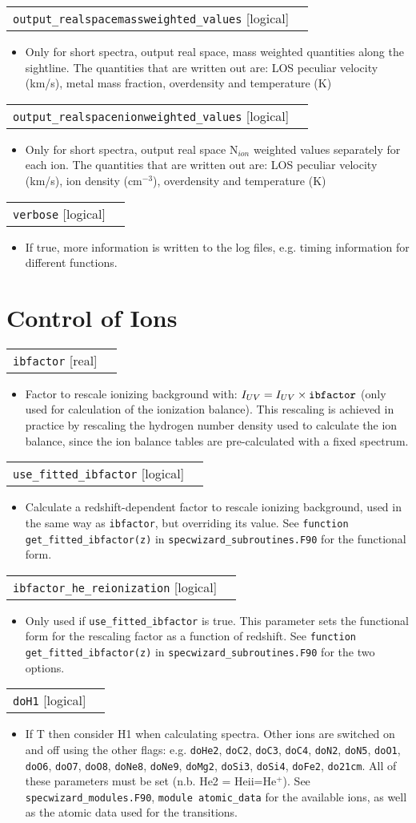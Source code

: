 \documentclass{report}
\makeatletter
\newcommand{\paramdefinition}[3]{
\begin{tabular*}{\textwidth}{l@{\extracolsep{\fill}}r}
		{\tt #1} [{\sc #2}]& #3 \\
\end{tabular*}}
\newcommand{\paramdescription}[1]{
\begin{itemize}
\item #1
\end{itemize}\vspace{0.2cm}}
\newcommand{\param}[1]{{\tt #1}}
\makeatother
\begin{document}
\paramdefinition{output\_realspacemassweighted\_values}{logical}{ }
\paramdescription{Only for short spectra, output real space, mass weighted quantities along the sightline.  The quantities that are written out are: LOS peculiar velocity (km/s), metal mass fraction, overdensity and temperature (K)}

\paramdefinition{output\_realspacenionweighted\_values}{logical}{ }
\paramdescription{Only for short spectra, output real space N$_{ion}$ weighted values separately for each ion.  The quantities that are written out are: LOS peculiar velocity (km/s), ion density (cm$^{-3}$), overdensity and temperature (K)}

\paramdefinition{verbose}{logical}{ }
\paramdescription{If true, more information is written to the log files, e.g. timing information for different functions.}


\section{Control of Ions}

\paramdefinition{ibfactor}{real}{}
\paramdescription{Factor to rescale ionizing background with: $I_{UV} = I_{UV}\times{\tt ibfactor}$ (only used for calculation of the ionization balance). This rescaling is achieved in practice by rescaling the hydrogen number density used to calculate the ion balance, since the ion balance tables are pre-calculated with a fixed spectrum.}

\paramdefinition{use\_fitted\_ibfactor}{logical}{}
\paramdescription{Calculate a redshift-dependent factor to rescale ionizing background, used in the same way as \param{ibfactor}, but overriding its value. See \param{function get\_fitted\_ibfactor(z)} in \param{specwizard\_subroutines.F90} for the functional form.}

\paramdefinition{ibfactor\_he\_reionization}{logical}{}
\paramdescription{Only used if \param{use\_fitted\_ibfactor} is true. This parameter sets the functional form for the rescaling factor as a function of redshift. See \param{function get\_fitted\_ibfactor(z)} in \param{specwizard\_subroutines.F90} for the two options.}

\paramdefinition{doH1}{logical}{}
\paramdescription{If T then consider H1 when calculating spectra.  Other ions are switched on and off using the other flags: e.g. {\tt doHe2}, {\tt doC2}, {\tt doC3}, {\tt doC4}, {\tt doN2}, {\tt doN5}, {\tt doO1}, {\tt doO6}, {\tt doO7}, {\tt doO8}, {\tt doNe8}, {\tt doNe9}, {\tt doMg2}, {\tt doSi3}, {\tt doSi4}, {\tt doFe2}, {\tt do21cm}.  All of these parameters must be set (n.b. He2 = He{\sc ii}=He$^+$). See \param{specwizard\_modules.F90}, \param{module atomic\_data} for the available ions, as well as the atomic data used for the transitions.}
\end{document}

